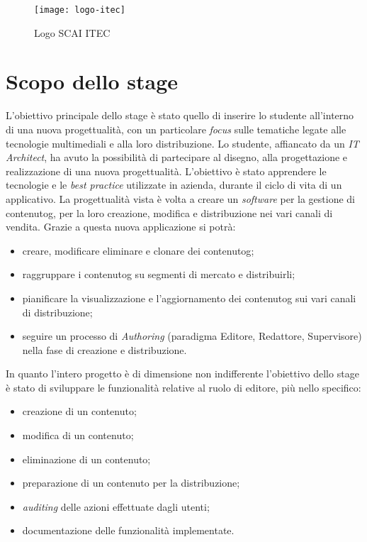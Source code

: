 \begin{figure}[h]
    \begin{center}
    \texttt{[image: logo-itec]}
    \caption{Logo SCAI ITEC}
    \label{fig:figure1}
    \end{center}
\end{figure}


\section{Scopo dello stage}
\label{sez:scopo}
L'obiettivo principale dello stage è stato quello di inserire lo studente all'interno di una nuova progettualità, con un particolare \textit{focus} sulle tematiche legate alle tecnologie multimediali e alla loro distribuzione. Lo studente, affiancato da un \textit{IT Architect}, ha avuto la possibilità di partecipare al disegno, alla progettazione e realizzazione di una nuova progettualità. L'obiettivo è stato apprendere le tecnologie e le \textit{best practice} utilizzate in azienda, durante il ciclo di vita di un applicativo.
La progettualità vista è volta a creare un \textit{software} per la gestione di \gls{contenutog}\glsfirstoccur{}, per la loro creazione, modifica e distribuzione nei vari canali di vendita.
Grazie a questa nuova applicazione si potrà:
\begin{itemize}
    \item creare, modificare eliminare e clonare dei \gls{contenutog};
    \item raggruppare i \gls{contenutog} su segmenti di mercato e distribuirli;
    \item pianificare la visualizzazione e l’aggiornamento dei \gls{contenutog} sui vari canali di distribuzione;
    \item seguire un processo di \textit{Authoring} (paradigma Editore, Redattore, Supervisore) nella fase di creazione e distribuzione.
\end{itemize} 
In quanto l'intero progetto è di dimensione non indifferente l'obiettivo dello stage è stato di sviluppare le funzionalità relative al ruolo di editore, più nello specifico:
\begin{itemize}
    \item creazione di un contenuto;
    \item modifica di un contenuto;
    \item eliminazione di un contenuto;
    \item preparazione di un contenuto per la distribuzione;
    \item \textit{auditing} delle azioni effettuate dagli utenti;
    \item documentazione delle funzionalità implementate.
\end{itemize}

